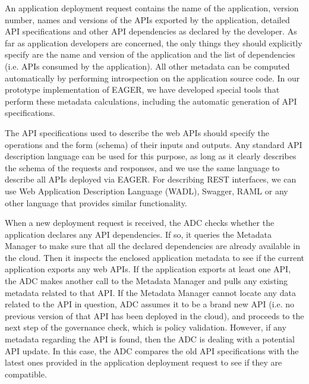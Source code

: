 An application deployment request contains the name of the application, version number, names and versions of the APIs
exported by the application, detailed API specifications and other API dependencies as declared by the developer. As far as application developers are
concerned, the only things they should explicitly specify are the name and version of the application and the list of dependencies (i.e. APIs consumed
by the application). All other metadata can be computed automatically by performing introspection on the
application source code. In our prototype implementation of EAGER, we have developed special tools that perform these metadata calculations, 
including the automatic generation of API specifications.

The API specifications used to describe the web APIs should specify the operations and the form (schema) of their inputs and outputs.
Any standard API description language can be used for this purpose, as long as it clearly describes the schema of the requests and
responses, and we use the same language to describe all APIs deployed via EAGER. For describing REST interfaces, we can use Web Application
Description Language (WADL), Swagger, RAML or any other language that provides similar functionality. %

When a new deployment request is received, the ADC checks whether the application declares any API dependencies. If so, it
queries the Metadata Manager to make sure that all the declared dependencies are already available in the cloud. 
Then it inspects the enclosed application metadata to see if the current application exports any web
APIs. If the application exports at least one API, the ADC makes another call to the Metadata Manager and pulls any existing 
metadata related to that API. If
the Metadata Manager cannot locate any data related to the API in question, ADC assumes it to be a brand new
API (i.e. no previous version of that API has been deployed in the cloud), and proceeds to the next step of the governance check, which is policy
validation. However, if any metadata regarding the API is found, then the ADC is dealing with a potential API update. In this
case, the ADC compares the old API specifications with the latest ones provided in the application deployment request to see if
they are compatible.

